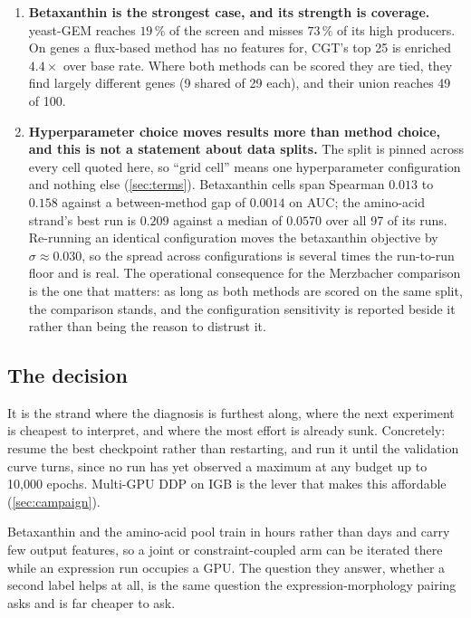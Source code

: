 \begin{enumerate}
\item \textbf{Betaxanthin is the strongest case, and its strength is coverage.} yeast-GEM
  reaches $19\,\%$ of the screen and misses $73\,\%$ of its high producers. On genes a
  flux-based method has no features for, CGT's top 25 is enriched $4.4\times$ over base
  rate. Where both methods can be scored they are tied, they find largely different genes
  (9 shared of 29 each), and their union reaches 49 of 100.

\item \textbf{Hyperparameter choice moves results more than method choice, and this is not a
  statement about data splits.} The split is pinned across every cell quoted here, so
  ``grid cell'' means one hyperparameter configuration and nothing else (\cref{sec:terms}).
  Betaxanthin cells span Spearman $0.013$ to $0.158$ against a between-method gap of
  $0.0014$ on AUC; the amino-acid strand's best run is $0.209$ against a median of $0.0570$
  over all 97 of its runs.
  Re-running an identical configuration moves the betaxanthin objective by
  $\sigma \approx 0.030$, so the spread across configurations is several times the
  run-to-run floor and is real. The operational consequence for the Merzbacher comparison is
  the one that matters: as long as both methods are scored on the same split, the comparison
  stands, and the configuration sensitivity is reported beside it rather than being the
  reason to distrust it.
\end{enumerate}

\subsection{The decision}

 It is the strand where the diagnosis is
furthest along, where the next experiment is cheapest to interpret, and where the most
effort is already sunk. Concretely: resume the best checkpoint rather than restarting, and
run it until the validation curve turns, since no run has yet observed a maximum at any
budget up to 10,000 epochs. Multi-GPU DDP on IGB is the lever that makes this affordable
(\cref{sec:campaign}).

 Betaxanthin and the
amino-acid pool train in hours rather than days and carry few output features, so a joint or
constraint-coupled arm can be iterated there while an expression run occupies a GPU. The
question they answer, whether a second label helps at all, is the same question the
expression-morphology pairing asks and is far cheaper to ask.


